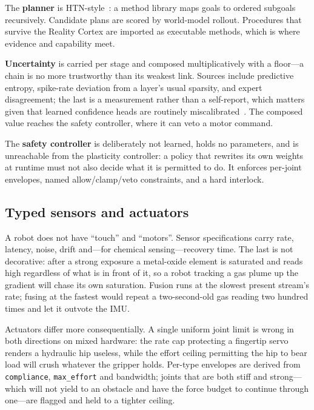 \documentclass[10pt,twocolumn]{article}
\begin{document}
The \textbf{planner} is HTN-style~\cite{erol1994}: a method library maps goals
to ordered subgoals recursively. Candidate plans are scored by world-model
rollout. Procedures that survive the Reality Cortex are imported as executable
methods, which is where evidence and capability meet.

\textbf{Uncertainty} is carried per stage and composed multiplicatively with a
floor---a chain is no more trustworthy than its weakest link. Sources include
predictive entropy, spike-rate deviation from a layer's usual sparsity, and
expert disagreement; the last is a measurement rather than a self-report, which
matters given that learned confidence heads are routinely
miscalibrated~\cite{guo2017}. The composed value reaches the safety controller,
where it can veto a motor command.

The \textbf{safety controller} is deliberately not learned, holds no
parameters, and is unreachable from the plasticity controller: a policy that
rewrites its own weights at runtime must not also decide what it is permitted
to do. It enforces per-joint envelopes, named allow/clamp/veto constraints, and
a hard interlock.

\subsection{Typed sensors and actuators}

A robot does not have ``touch'' and ``motors''. Sensor specifications carry
rate, latency, noise, drift and---for chemical sensing---recovery time. The
last is not decorative: after a strong exposure a metal-oxide element is
saturated and reads high regardless of what is in front of it, so a robot
tracking a gas plume up the gradient will chase its own saturation. Fusion runs
at the slowest present stream's rate; fusing at the fastest would repeat a
two-second-old gas reading two hundred times and let it outvote the IMU.

Actuators differ more consequentially. A single uniform joint limit is wrong in
both directions on mixed hardware: the rate cap protecting a fingertip servo
renders a hydraulic hip useless, while the effort ceiling permitting the hip to
bear load will crush whatever the gripper holds. Per-type envelopes are derived
from \texttt{compliance}, \texttt{max\_effort} and bandwidth; joints that are
both stiff and strong---which will not yield to an obstacle and have the force
budget to continue through one---are flagged and held to a tighter ceiling.
\end{document}
